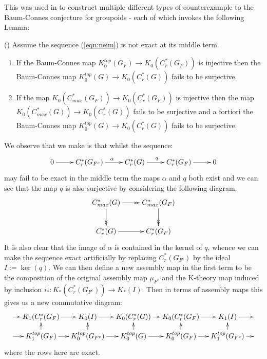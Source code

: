 \begin{conjecture}
{This was used in \cite{MR1911663} to construct multiple different types of counterexample to the Baum-Connes conjecture for groupoids - each of which invokes the following Lemma:
\begin{lemma}\label{Lem:Lemma1}(\cite[Lemma 1]{MR1911663})
Assume the sequence (\ref{eqn:neim}) is not exact at its middle term.
\begin{enumerate}
\item If the Baum-Connes map $K_{0}^{top}(G_{F}) \rightarrow K_{0}(C^{*}_{r}(G_{F}))$ is injective then the Baum-Connes map $K_{0}^{top}(G) \rightarrow K_{0}(C^{*}_{r}(G))$ fails to be surjective.
\item If the map $K_{0}(C^{*}_{max}(G_{F})) \rightarrow K_{0}(C^{*}_{r}(G_{F}))$ is injective then the map $K_{0}(C^{*}_{max}(G)) \rightarrow K_{0}(C^{*}_{r}(G))$ fails to be surjective and a fortiori the Baum-Connes map $K_{0}^{top}(G) \rightarrow K_{0}(C^{*}_{r}(G))$ fails to be surjective.
\end{enumerate}
\end{lemma}

We observe that we make is that whilst the sequence:
\begin{equation*}
\xymatrix{
0 \ar[r] & C_{r}^{*}(G_{F^{c}}) \ar[r]^{\alpha}& C_{r}^{*}(G) \ar[r]^{q} & C_{r}^{*}(G_{F}) \ar[r] & 0
}
\end{equation*}
may fail to be exact in the middle term the maps $\alpha$ and $q$ both exist and we can see that the map $q$ is also surjective by considering the following diagram.
\begin{equation*}
\xymatrix{C^{*}_{max}(G) \ar@{->>}[r] \ar@{->>}[d] & C^{*}_{max}(G_{F}) \ar@{->>}[d]\\
C^{*}_{r}(G)\ar@{->}[r] &   C^{*}_{r}(G_{F})
}
\end{equation*}
It is also clear that the image of $\alpha$ is contained in the kernel of $q$, whence we can make the sequence exact artificially by replacing $C_{r}^{*}(G_{F^{c}})$ by the ideal $I:=\ker(q)$. We can then define a new assembly map in the first term to be the composition of the original assembly map $\mu_{F^{c}}$ and the K-theory map induced by inclusion $i_{*}:K_{*}(C^{*}_{r}(G_{F^{c}})) \rightarrow K_{*}(I)$. Then in terms of assembly maps this gives us a new commutative diagram:
\begin{equation*}\label{Fig:F1}
\xymatrix@=1em{
\ar[r] & K_{1}(C^{*}_{r}(G_{F}) \ar[r] & K_{0}(I) \ar[r]& K_{0}(C^{*}_{r}(G)) \ar[r]& K_{0}(C^{*}_{r}(G_{F})\ar[r] & K_{1}(I) \ar[r] & \\
\ar[r] & K_{1}^{top}(G_{F}) \ar[r] \ar[u]& K_{0}^{top}(G_{F^{c}}) \ar[r]\ar[u]& K_{0}^{top}(G) \ar[r]\ar[u]& K_{0}^{top}(G_{F}) \ar[r]\ar[u]& K_{1}^{top}(G_{F^{c}})\ar[u] \ar[r]& 
}
\end{equation*}
where the rows here are exact. 

}
\end{conjecture}
